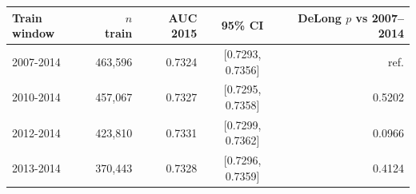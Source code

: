 \begin{tabular}{lrrcr}
\toprule
Train window & $n$ train & AUC 2015 & 95\% CI & DeLong $p$ vs 2007--2014 \\
\midrule
2007-2014 & 463,596 & 0.7324 & [0.7293, 0.7356] & ref. \\
2010-2014 & 457,067 & 0.7327 & [0.7295, 0.7358] & 0.5202 \\
2012-2014 & 423,810 & 0.7331 & [0.7299, 0.7362] & 0.0966 \\
2013-2014 & 370,443 & 0.7328 & [0.7296, 0.7359] & 0.4124 \\
\bottomrule
\end{tabular}
